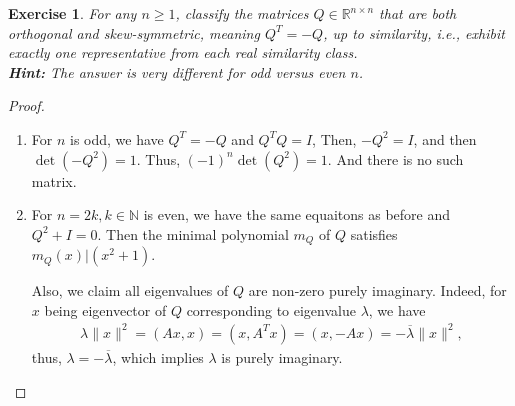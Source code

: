 \documentclass[11pt]{article}
\newtheorem{exercise}{Exercise}[section]
\theoremstyle{definition}
\numberwithin{equation}{subsection}
\begin{document}
\medskip

\begin{exercise}{\rm *}
For any $n \geq 1$, classify the matrices $Q \in \mathbb{R}^{n \times n}$ that are both orthogonal and skew-symmetric, meaning $Q^T = -Q$, up to similarity, i.e., exhibit exactly one representative from each real similarity class. \\
{\bf Hint:} The answer is very different for odd versus even $n$.
\end{exercise}
\begin{proof}
~\begin{enumerate}[label=(\alph*)]
    \item For $n$ is odd, we have $Q^T  = -Q$ and $Q^T Q = I$, Then, $- Q^2 = I$, and then $\det (- Q^2) = 1$. Thus, $(-1)^n \det (Q^2) = 1$. And there is no such matrix.
    
    \item For $n = 2k, k \in \mathbb{N}$ is even, we have the same equaitons as before and $Q^2 + I = 0$. Then the minimal polynomial $m_Q$ of $Q$ satisfies $m_Q(x)|(x^2 + 1)$. 
    
    Also, we claim all eigenvalues of $Q$ are non-zero purely imaginary\cite{3}. Indeed, for $x$ being eigenvector of $Q$ corresponding to eigenvalue $\lambda$, we have 
    \begin{align*}
        \lambda \|x\|^2 = (Ax, x) = (x, A^T x) = (x, - A x) = - \overline{\lambda} \|x\|^2,
    \end{align*}
    thus, $\lambda = -\overline{\lambda}$, which implies $\lambda$ is purely imaginary.
    

\end{enumerate}
\end{proof}
\end{document}
